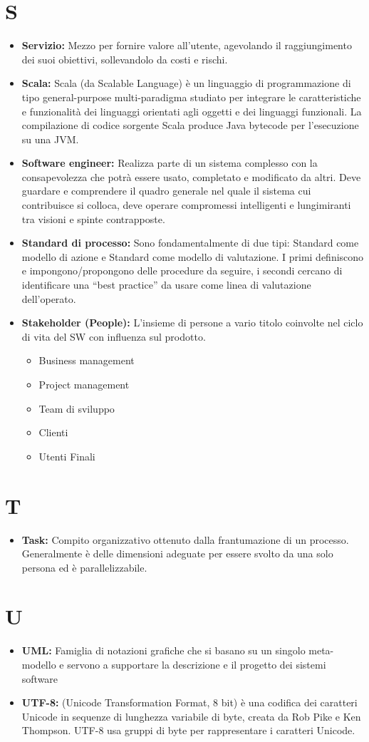 \documentclass[a4paper]{report}
\newcommand{\mychapter}[2]{
	\setcounter{chapter}{#1}
	\setcounter{section}{0}
	\setcounter{subsection}{1}
	\chapter*{#2}
	\addcontentsline{toc}{chapter}{#2}
}
\begin{document}
	\mychapter{16}{S}
		\begin{itemize}
			\item \textbf{Servizio:} Mezzo per fornire valore all'utente, agevolando il raggiungimento dei suoi obiettivi, 
			sollevandolo da costi e rischi.
			\item \textbf{Scala:} Scala (da Scalable Language) è un linguaggio di programmazione di tipo general-purpose
			 multi-paradigma studiato per integrare le caratteristiche e funzionalità dei linguaggi orientati agli oggetti e dei linguaggi
			  funzionali. La compilazione di codice sorgente Scala produce Java bytecode per l'esecuzione su una JVM.
			\item \textbf{Software engineer:} Realizza parte di un sistema complesso con la consapevolezza che potrà essere 
			usato, completato e modificato da altri. Deve guardare e comprendere il quadro generale nel quale il sistema cui 
			contribuisce si colloca, deve operare compromessi intelligenti e lungimiranti tra visioni e spinte contrapposte.
			\item \textbf{Standard di processo:} Sono fondamentalmente di due tipi: Standard come modello di azione e Standard 
			come modello di valutazione. I primi definiscono e impongono/propongono delle procedure da seguire, i secondi 
			cercano di identificare una “best practice” da usare come linea di valutazione dell’operato.
			\item \textbf{Stakeholder (People):} L’insieme di persone a vario titolo coinvolte nel ciclo di vita del SW con 
			influenza sul prodotto.
			\begin{itemize}
				\item  Business management
			  	\item  Project management
			  	\item  Team di sviluppo
			  	\item  Clienti
			  	\item  Utenti Finali
			\end{itemize}
		\end{itemize}
		
	\mychapter{17}{T}
		\begin{itemize}	
			\item \textbf{Task:} Compito organizzativo ottenuto dalla frantumazione di un processo. Generalmente è delle 
			dimensioni adeguate per essere svolto da una solo persona ed è parallelizzabile.
		\end{itemize}
		
	\mychapter{18}{U}
		\begin{itemize}	
			\item \textbf{UML:} Famiglia di notazioni grafiche che si basano su un singolo meta-modello e servono a supportare la descrizione e il progetto dei sistemi software	
			\item \textbf{UTF-8:} (Unicode Transformation Format, 8 bit) è una codifica dei caratteri Unicode in sequenze 
			di lunghezza variabile di byte, creata da Rob Pike e Ken Thompson. UTF-8 usa gruppi di byte per rappresentare i caratteri Unicode.		
		\end{itemize}
		
\end{document}
